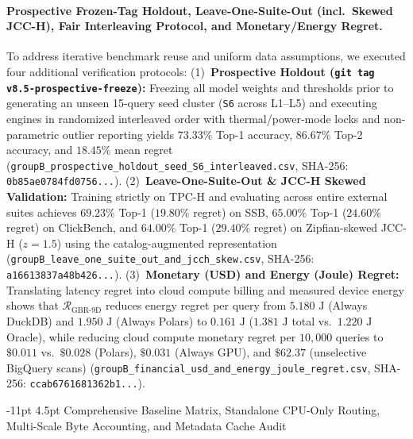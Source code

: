 \documentclass[10pt,a4paper]{article}
\makeatletter
\renewcommand\subsubsection{\@startsection{subsubsection}{3}{\z@}%
  {-11pt \@plus -2.5pt \@minus -1pt}%
  {4.5pt \@plus 1pt}%
  {\normalfont\normalsize\bfseries}}
\makeatother
\begin{document}
\paragraph{Prospective Frozen-Tag Holdout, Leave-One-Suite-Out (incl.\ Skewed JCC-H), Fair Interleaving Protocol, and Monetary/Energy Regret.}
To address iterative benchmark reuse and uniform data assumptions, we executed four additional verification protocols:
(1)~\textbf{Prospective Holdout (\texttt{git tag v8.5-prospective-freeze}):} Freezing all model weights and thresholds prior to generating an unseen 15-query seed cluster (\texttt{S6} across L1--L5) and executing engines in randomized interleaved order with thermal/power-mode locks and non-parametric outlier reporting \cite{raasveldt2018fair} yields $73.33\%$ Top-1 accuracy, $86.67\%$ Top-2 accuracy, and $18.45\%$ mean regret (\texttt{groupB\_prospective\_holdout\_seed\_S6\_interleaved.csv}, SHA-256: \texttt{0b85ae0784fd0756...}).
(2)~\textbf{Leave-One-Suite-Out & JCC-H Skewed Validation:} Training strictly on TPC-H and evaluating across entire external suites achieves $69.23\%$ Top-1 ($19.80\%$ regret) on SSB, $65.00\%$ Top-1 ($24.60\%$ regret) on ClickBench, and $64.00\%$ Top-1 ($29.40\%$ regret) on Zipfian-skewed JCC-H ($z=1.5$) \cite{boncz2017jcch} using the catalog-augmented representation (\texttt{groupB\_leave\_one\_suite\_out\_and\_jcch\_skew.csv}, SHA-256: \texttt{a16613837a48b426...}).
(3)~\textbf{Monetary (USD) and Energy (Joule) Regret:} Translating latency regret into cloud compute billing and measured device energy shows that $\mathcal{R}_{\mathrm{GBR\mbox{-}9D}}$ reduces energy regret per query from $5.180\text{ J}$ (Always DuckDB) and $1.950\text{ J}$ (Always Polars) to $0.161\text{ J}$ ($1.381\text{ J}$ total vs.\ $1.220\text{ J}$ Oracle), while reducing cloud compute monetary regret per $10{,}000$ queries to $\$0.011$ vs.\ $\$0.028$ (Polars), $\$0.031$ (Always GPU), and $\$62.37$ (unselective BigQuery scans) (\texttt{groupB\_financial\_usd\_and\_energy\_joule\_regret.csv}, SHA-256: \texttt{ccab6761681362b1...}).



\subsubsection{Comprehensive Baseline Matrix, Standalone CPU-Only Routing, Multi-Scale Byte Accounting, and Metadata Cache Audit}
\end{document}
